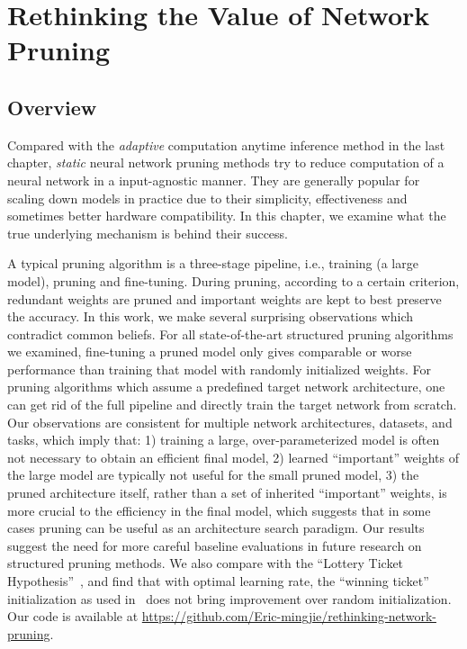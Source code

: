 \chapter{Rethinking the Value of Network Pruning}

\section{Overview}
Compared with the \emph{adaptive} computation anytime inference method in the last chapter, \emph{static} neural network pruning methods try to reduce computation of a neural network in a input-agnostic manner. They are generally popular for scaling down models in practice due to their simplicity, effectiveness and sometimes better hardware compatibility. In this chapter, we examine what the true underlying mechanism is behind their success. 

A typical pruning algorithm is a three-stage pipeline, i.e., training (a large model), pruning and fine-tuning. During pruning, according to a certain criterion, redundant weights are pruned and important weights are kept to best preserve the accuracy. In this work, we make several surprising observations which contradict common beliefs. For all state-of-the-art structured pruning algorithms we examined, fine-tuning a pruned model only gives comparable or worse performance than training that model with randomly initialized weights. 
For pruning algorithms which assume a predefined target network architecture, one can get rid of the full pipeline and directly train the target network from scratch.
Our observations are consistent for multiple network architectures, datasets, and tasks, which imply that: 1) training a large, over-parameterized model is often not necessary to obtain an efficient final model, 2) learned ``important'' weights of the large model are typically not useful for the small pruned model, 3) the pruned architecture itself, rather than a set of inherited ``important'' weights, is more crucial to the efficiency in the final model, which suggests that in some cases pruning can be useful as an architecture search paradigm.
Our results suggest the need for more careful baseline evaluations in future research on structured pruning methods. 
We also compare with the ``Lottery Ticket Hypothesis''~\cite{lottery}, and find that with optimal learning rate, the ``winning ticket'' initialization as used in~\cite{lottery} does not bring improvement over random initialization. Our code is available at \url{https://github.com/Eric-mingjie/rethinking-network-pruning}.

